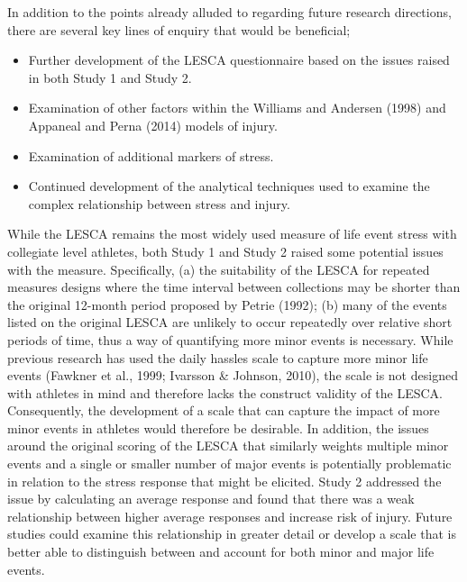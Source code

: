 \documentclass[
  english,
  man,floatsintext]{apa6}
\providecommand{\tightlist}{%
  \setlength{\itemsep}{0pt}\setlength{\parskip}{0pt}}
\begin{document}
In addition to the points already alluded to regarding future research directions, there are several key lines of enquiry that would be beneficial;

\begin{itemize}
\tightlist
\item
  Further development of the LESCA questionnaire based on the issues raised in both Study 1 and Study 2.
\item
  Examination of other factors within the Williams and Andersen (1998) and Appaneal and Perna (2014) models of injury.
\item
  Examination of additional markers of stress.
\item
  Continued development of the analytical techniques used to examine the complex relationship between stress and injury.
\end{itemize}

While the LESCA remains the most widely used measure of life event stress with collegiate level athletes, both Study 1 and Study 2 raised some potential issues with the measure.
Specifically, (a) the suitability of the LESCA for repeated measures designs where the time interval between collections may be shorter than the original 12-month period proposed by Petrie (1992);
(b) many of the events listed on the original LESCA are unlikely to occur repeatedly over relative short periods of time, thus a way of quantifying more minor events is necessary.
While previous research has used the daily hassles scale to capture more minor life events (Fawkner et al., 1999; Ivarsson \& Johnson, 2010), the scale is not designed with athletes in mind and therefore lacks the construct validity of the LESCA.
Consequently, the development of a scale that can capture the impact of more minor events in athletes would therefore be desirable.
In addition, the issues around the original scoring of the LESCA that similarly weights multiple minor events and a single or smaller number of major events is potentially problematic in relation to the stress response that might be elicited.
Study 2 addressed the issue by calculating an average response and found that there was a weak relationship between higher average responses and increase risk of injury.
Future studies could examine this relationship in greater detail or develop a scale that is better able to distinguish between and account for both minor and major life events.
\end{document}
